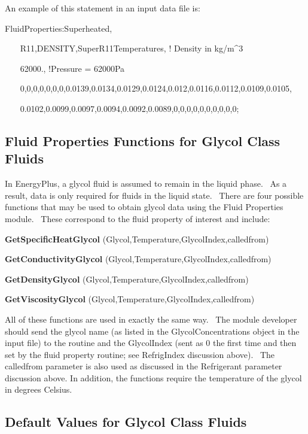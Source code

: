 An example of this statement in an input data file is:

FluidProperties:Superheated,

~~~ R11,DENSITY,SuperR11Temperatures, ! Density in kg/m\^{}3

~~~ 62000., !Pressure = 62000Pa

~~~ 0,0,0,0,0,0,0,0.0139,0.0134,0.0129,0.0124,0.012,0.0116,0.0112,0.0109,0.0105,

~~~ 0.0102,0.0099,0.0097,0.0094,0.0092,0.0089,0,0,0,0,0,0,0,0,0,0;

\subsection{Fluid Properties Functions for Glycol Class Fluids}\label{fluid-properties-functions-for-glycol-class-fluids}

In EnergyPlus, a glycol fluid is assumed to remain in the liquid phase.~ As a result, data is only required for fluids in the liquid state.~ There are four possible functions that may be used to obtain glycol data using the Fluid Properties module.~ These correspond to the fluid property of interest and include:

\textbf{GetSpecificHeatGlycol} (Glycol,Temperature,GlycolIndex,calledfrom)

\textbf{GetConductivityGlycol} (Glycol,Temperature,GlycolIndex,calledfrom)

\textbf{GetDensityGlycol} (Glycol,Temperature,GlycolIndex,calledfrom)

\textbf{GetViscosityGlycol} (Glycol,Temperature,GlycolIndex,calledfrom)

All of these functions are used in exactly the same way.~ The module developer should send the glycol name (as listed in the GlycolConcentrations object in the input file) to the routine and the GlycolIndex (sent as 0 the first time and then set by the fluid property routine; see RefrigIndex discussion above).~ The calledfrom parameter is also used as discussed in the Refrigerant parameter discussion above. In addition, the functions require the temperature of the glycol in degrees Celsius.

\subsection{Default Values for Glycol Class Fluids}\label{default-values-for-glycol-class-fluids}


